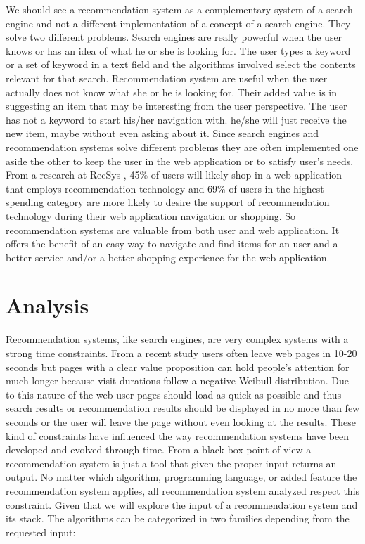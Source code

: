 We should see a recommendation system as a complementary system of a search engine and not a different implementation of a concept of a search engine. They solve two different problems. Search engines are really powerful when the user knows or has an idea of what he or she is looking for. The user types a keyword or a set of keyword in a text field and the algorithms involved select the contents relevant for that search.
Recommendation system are useful when the user actually does not know what she or he is looking for. Their added value is in suggesting an item that may be interesting from the user perspective. The user has not a keyword to start his/her navigation with. he/she will just receive the new item, maybe without even asking about it. Since search engines and recommendation systems solve different problems they are often implemented one aside the other to keep the user in the web application or to satisfy user's needs. From a research \cite{usercentric_evaluation_framework} at RecSys \cite{recsys}, 45\% of users will likely shop in a web application that employs recommendation technology and 69\% of users in the highest spending category are more likely to desire the support of recommendation technology during their web application navigation or shopping. So recommendation systems are valuable from both user and web application. It offers the benefit of an easy way to navigate and find items for an user and a better service and/or a better shopping experience for the web application.

\section{Analysis}
\label{sec:Analysis}

Recommendation systems, like search engines, are very complex systems with a strong time constraints. From a recent study \cite{page-abandonment} users often leave web pages in 10-20 seconds but pages with a clear value proposition can hold people's attention for much longer because visit-durations follow a negative Weibull distribution. Due to this nature of the web user pages should load as quick as possible and thus search results or recommendation results should be displayed in no more than few seconds or the user will leave the page without even looking at the results. These kind of constraints have influenced the way recommendation systems have been developed and evolved through time.
From a black box point of view a recommendation system is just a tool that given the proper input returns an output. No matter which algorithm, programming language, or added feature the recommendation system applies, all recommendation system analyzed respect this constraint. Given that we will explore the input of a recommendation system and its stack. The algorithms can be categorized in two families depending from the requested input:

